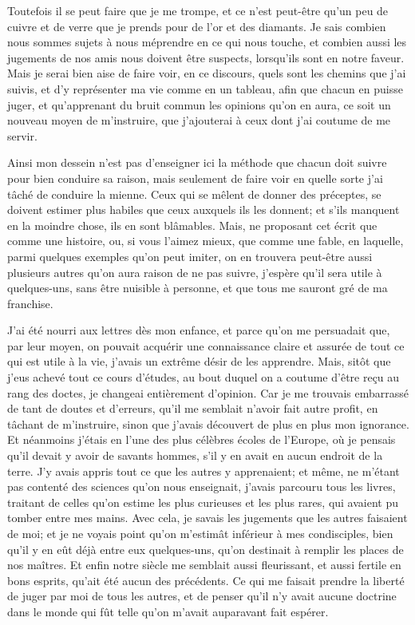 \documentclass[french,twoside]{book} %
\begin{document}
Toutefois il se peut faire que je me trompe, et ce n'est peut-être qu'un peu de cuivre et de verre que je prends pour de l'or et des diamants. Je sais combien nous sommes sujets à nous méprendre en ce qui nous touche, et combien aussi les jugements de nos amis nous doivent être suspects, lorsqu'ils sont en notre faveur. Mais je serai bien aise de faire voir, en ce discours, quels sont les chemins que j'ai suivis, et d'y représenter ma vie comme en un tableau, afin que chacun en puisse juger, et qu'apprenant du bruit commun les opinions qu'on en aura, ce soit un nouveau moyen de m'instruire, que j'ajouterai à ceux dont j'ai coutume de me servir.\par
Ainsi mon dessein n'est pas d'enseigner ici la méthode que chacun doit suivre pour bien conduire sa raison, mais seulement de faire voir en quelle sorte j'ai tâché de conduire la mienne. Ceux qui se mêlent de donner des préceptes, se doivent estimer plus habiles que ceux auxquels ils les donnent; et s'ils manquent en la moindre chose, ils en sont blâmables. Mais, ne proposant cet écrit que comme une histoire, ou, si vous l'aimez mieux, que comme une fable, en laquelle, parmi quelques exemples qu'on peut imiter, on en trouvera peut-être aussi plusieurs autres qu'on aura raison de ne pas suivre, j'espère qu'il sera utile à quelques-uns, sans être nuisible à personne, et que tous me sauront gré de ma franchise.\par
J'ai été nourri aux lettres dès mon enfance, et parce qu'on me persuadait que, par leur moyen, on pouvait acquérir une connaissance claire et assurée de tout ce qui est utile à la vie, j'avais un extrême désir de les apprendre. Mais, sitôt que j'eus achevé tout ce cours d'études, au bout duquel on a coutume d'être reçu au rang des doctes, je changeai entièrement d'opinion. Car je me trouvais embarrassé de tant de doutes et d'erreurs, qu'il me semblait n'avoir fait autre profit, en tâchant de m'instruire, sinon que j'avais découvert de plus en plus mon ignorance. Et néanmoins j'étais en l'une des plus célèbres écoles de l'Europe, où je pensais qu'il devait y avoir de savants hommes, s'il y en avait en aucun endroit de la terre. J'y avais appris tout ce que les autres y apprenaient; et même, ne m'étant pas contenté des sciences qu'on nous enseignait, j'avais parcouru tous les livres, traitant de celles qu'on estime les plus curieuses et les plus rares, qui avaient pu tomber entre mes mains. Avec cela, je savais les jugements que les autres faisaient de moi; et je ne voyais point qu'on m'estimât inférieur à mes condisciples, bien qu'il y en eût déjà entre eux quelques-uns, qu'on destinait à remplir les places de nos maîtres. Et enfin notre siècle me semblait aussi fleurissant, et aussi fertile en bons esprits, qu'ait été aucun des précédents. Ce qui me faisait prendre la liberté de juger par moi de tous les autres, et de penser qu'il n'y avait aucune doctrine dans le monde qui fût telle qu'on m'avait auparavant fait espérer.\par
\end{document}
